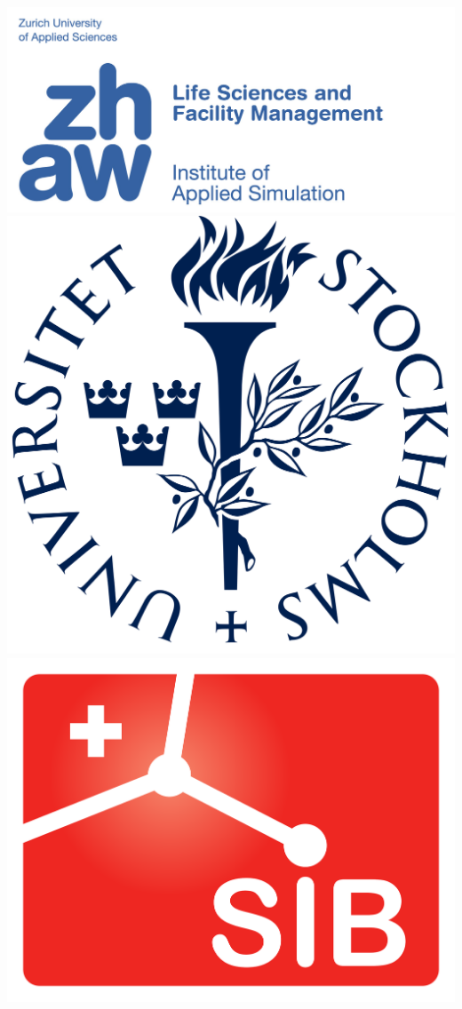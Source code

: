 \documentclass[a0paper,fleqn]{betterposter}
\begin{document}
{{%
\begin{minipage}[t]{\textwidth}
    \begin{center}
    \includegraphics[width=0.1\paperwidth]{img/zhaw_lsfm_ias_blau_en.jpg}
    \includegraphics[width=0.05\paperwidth]{img/logo_SU.png}
    \includegraphics[width=0.06\paperwidth]{img/logo_sib.png}    
    \end{center}
\end{minipage}

}}
\end{document}
